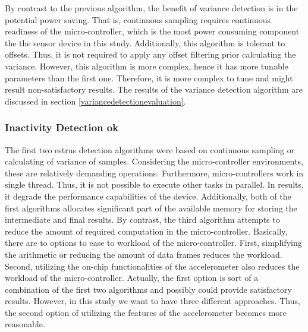 \documentclass[english,12pt,a4paper,pdftex,elec,utf8]{aaltothesis}
\begin{document}
By contrast to the previous algorithm, the benefit of variance detection is in the potential power saving. That is, continuous sampling requires continuous readiness of the micro-controller, which is the most power consuming component the the sensor device in this study. Additionally, this algorithm is tolerant to offsets. Thus, it is not required to apply any offset filtering prior calculating the variance. However, this algorithm is more complex, hence it has more tunable parameters than the first one. Therefore, it is more complex to tune and might result non-satisfactory results. The results of the variance detection algorithm are discussed in section \ref{variancedetectionevaluation}. 

\subsubsection{Inactivity Detection ok} \label{inactivitydetectionsection}


The first two estrus detection algorithms were based on continuous sampling or calculating of variance of samples. Considering the micro-controller environments, these are relatively demanding operations. Furthermore, micro-controllers work in single thread. Thus, it is not possible to execute other tasks in parallel. In results, it degrade the performance capabilities of the device. Additionally, both of the first algorithms allocates significant part of the available memory for storing the intermediate and final results. By contrast, the third algorithm attempts to reduce the amount of required computation in the micro-controller. Basically, there are to options to ease to workload of the micro-controller. First, simplifying the arithmetic or reducing the amount of data frames reduces the workload. Second, utilizing the on-chip functionalities of the accelerometer also reduces the workload of the micro-controller. Actually, the first option is sort of a combination of the first two algorithms and possibly could provide satisfactory results. However, in this study we want to have three different approaches. Thus, the second option of utilizing the features of the accelerometer becomes more reasonable.
\end{document}
